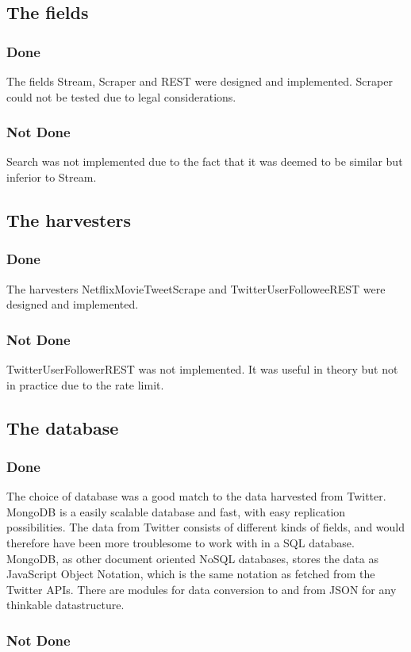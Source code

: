 \subsection{The fields}
\subsubsection{Done}
The fields Stream, Scraper and REST were designed and implemented. Scraper could not be tested due to legal considerations.
\subsubsection{Not Done}
Search was not implemented due to the fact that it was deemed to be similar but inferior to Stream.

\subsection{The harvesters}
\subsubsection{Done}
The harvesters NetflixMovieTweetScrape
and TwitterUserFolloweeREST were designed and implemented.
\subsubsection{Not Done}
TwitterUserFollowerREST was not implemented. It was useful in theory but not in practice due to the rate limit.

\subsection{The database}
\subsubsection{Done}
The choice of database was a good match to the data harvested from Twitter. MongoDB is a easily scalable database and fast, with easy replication possibilities. The data from Twitter consists of different kinds of fields, and would therefore have been more troublesome to work with in a SQL database. MongoDB, as other document oriented NoSQL databases, stores the data as JavaScript Object Notation, which is the same notation as fetched from the Twitter APIs. There are modules for data conversion to and from JSON for any thinkable datastructure.

\subsubsection{Not Done}


